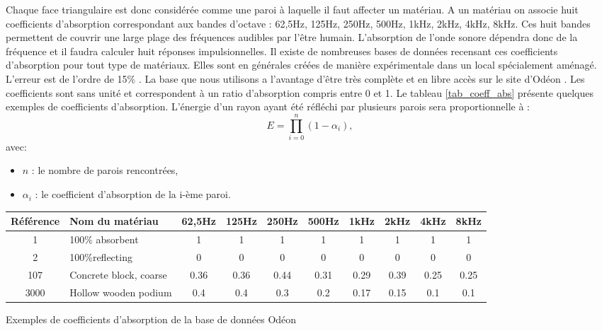 Chaque face triangulaire est donc considérée comme une paroi à laquelle il faut affecter un matériau. A un matériau on associe huit coefficients d'absorption correspondant aux bandes d'octave : 62,5Hz, 125Hz, 250Hz, 500Hz, 1kHz, 2kHz, 4kHz, 8kHz. Ces huit bandes permettent de couvrir une large plage des fréquences audibles par l'être humain. L'absorption de l'onde sonore dépendra donc de la fréquence et il faudra calculer huit réponses impulsionnelles. Il existe de nombreuses bases de données recensant ces coefficients d'absorption pour tout type de matériaux. Elles sont en générales créées de manière expérimentale dans un local spécialement aménagé. L'erreur est de l'ordre de 15\% \cite[]{acouphile}. La base que nous utilisons a l'avantage d'être très complète et en libre accès sur le site d'Odéon \cite[Materials]{odeon}. Les coefficients sont sans unité et correspondent à un ratio d'absorption compris entre 0 et 1. Le tableau \ref{tab_coeff_abs} présente quelques exemples de coefficients d'absorption. L'énergie d'un rayon ayant été réfléchi par plusieurs parois sera proportionnelle à :
\begin{equation} \label{eq_coeff_abs}
E = \prod_{i=0}^n (1-\alpha_i),
\end{equation}
avec: 
\begin{itemize}
\item $n$ : le nombre de parois rencontrées,
\item $\alpha_i$ : le coefficient d'absorption de la i-ème paroi.
\end{itemize}
%
\begin{tableth} \label{tab_coeff_abs}
\footnotesize
	\begin{tabular}{| c | m{2.5cm} | *{8}{c|}}
		\hline
		Référence & Nom du matériau & 62,5Hz & 125Hz & 250Hz & 500Hz & 1kHz & 2kHz & 4kHz & 8kHz \\
		  \hline
		  \hline
		   1 & 100\% absorbent & 1 & 1 & 1 & 1 & 1 & 1 & 1 & 1 \\
		   \hline
		2 & 100\%reflecting & 0 & 0 & 0 & 0 & 0 & 0 & 0 & 0 \\
		   \hline
		107 & Concrete block, coarse\footnotemark & 0.36 & 0.36 & 0.44 & 0.31 & 0.29 & 0.39 & 0.25 & 0.25 \\
		   \hline
		3000 & Hollow wooden podium\footnotemark & 0.4 & 0.4 & 0.3 & 0.2 & 0.17 & 0.15 & 0.1 & 0.1 \\
	     \hline
	 \end{tabular}
	\caption{Exemples de coefficients d'absorption de la base de données Odéon}
	\label{exempleOdeon}
\end{tableth}
\addtocounter{footnote}{-1}
\addtocounter{footnote}{1}
%



